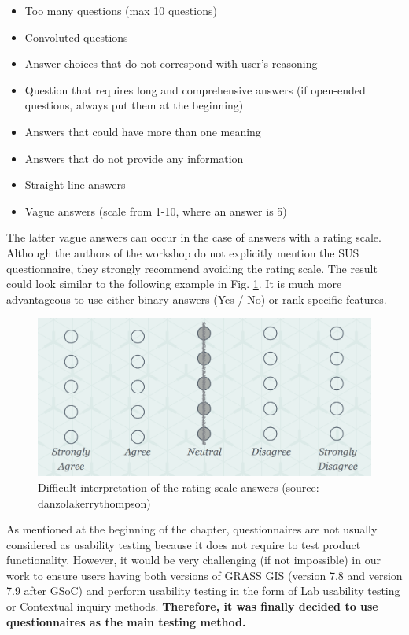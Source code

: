\documentclass[a4paper,10pt,twoside]{article}
\begin{document}
\begin{itemize}
\item Too many questions (max 10 questions)
\item Convoluted questions
\item Answer choices that do not correspond with user's reasoning
\item Question that requires long and comprehensive answers (if open-ended questions, always put them at the beginning)
\item Answers that could have more than one meaning
\item Answers that do not provide any information
\item Straight line answers
\item Vague answers (scale from 1-10, where an answer is 5)
\end{itemize}

\noindent The latter vague answers can occur in the case of answers with a rating scale. Although the authors of the workshop do not explicitly mention the SUS questionnaire, they strongly recommend avoiding the rating scale. The result could look similar to the following example in Fig. \ref{fig:blur_scale}. It is much more advantageous to use either binary answers (Yes / No) or rank specific features.

\vspace{0.3cm}
\begin{figure}[hbt!] 
\begin{center}
\includegraphics[width=12.5cm]{../pictures/blur_scale.png} 
\caption[Difficult interpretation of the rating scale answers]{Difficult interpretation of the rating scale answers (source: danzolakerrythompson)}
\label{fig:blur_scale}
\end{center}
\end{figure}

\noindent As mentioned at the beginning of the chapter, questionnaires are not usually considered as usability testing because it does not require to test product functionality. However, it would be very challenging (if not impossible) in our work to ensure users having both versions of GRASS GIS (version 7.8 and version 7.9 after GSoC) and perform usability testing in the form of Lab usability testing or Contextual inquiry methods. \textbf{Therefore, it was finally decided to use questionnaires as the main testing method.}
\end{document}
